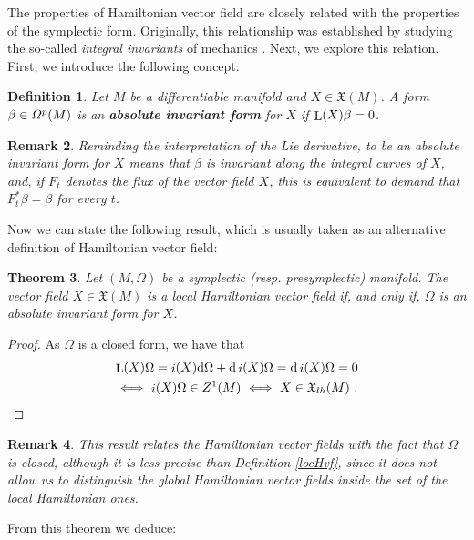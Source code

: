 \documentclass[12pt]{report}
\newtheorem{teor}{Theorem}[chapter]
\newtheorem{definition}[teor]{Definition}
\newtheorem{remark}[teor]{Remark}
\def\qed{\ifvmode\removelastskip\fi
{\unskip\nobreak\hfil\penalty50\hbox{}\nobreak\hfil
\hbox{\vrule height1.2ex width1.2ex}\parfillskip=0pt
\finalhyphendemerits=0 \par\smallskip}}
\def\vf{\mathfrak X}
\def\df{{\mit\Omega}}
\def\d{{\rm d}}
\def\Lie{\mathop{\rm L}\nolimits}
\def\inn{\mathop{i}\nolimits}
\begin{document}
The properties of Hamiltonian vector field are closely related with the properties
of the symplectic form. 
Originally, this relationship was established by studying the so-called {\sl integral invariants} of mechanics \cite{Ca-22,DG-80,Ga-70}.
Next, we explore this relation.
First, we introduce the following concept:

\begin{definition}
Let $M$ be a differentiable manifold and $X \in \vf (M)$.
A form $\beta \in \df^p(M)$ is an \textbf{absolute invariant form}
for $X$ if $\Lie (X)\beta = 0$.
\end{definition}

\begin{remark}{\rm  
Reminding the interpretation of the Lie derivative,
to be an absolute invariant form for $X$ means that
$\beta$ is invariant along the integral curves of $X$,
and, if $F_t$ denotes the flux of the vector field $X$,
this is equivalent to demand that $F_t^*\beta = \beta$ for every $t$.
}\end{remark}

Now we can state the following result, which is usually taken 
as an alternative definition of Hamiltonian vector field:

\begin{teor}
Let $(M,\Omega )$ be a symplectic (resp. presymplectic) manifold.
The vector field $X \in \vf (M)$ is a
local Hamiltonian vector field if, and only if,
$\Omega$ is an absolute invariant form for $X$.
\label{teoin}
\end{teor}
\begin{proof}
As $\Omega$ is a closed form, we have that
\begin{multline*}
\Lie (X)\Omega = \inn (X)\d \Omega + \d\inn (X)\Omega =
\d\inn (X)\Omega = 0 \\
\ \Longleftrightarrow \  \inn (X)\Omega \in Z^1(M)
\ \Longleftrightarrow \ X \in \vf_{lh}(M) \ .
\end{multline*}
  \qed  \end{proof}

\begin{remark}{\rm 
This result relates the Hamiltonian vector fields with the fact that $\Omega$
is closed, although it is less precise than Definition \ref{locHvf},
since it does not allow us to distinguish the global Hamiltonian vector fields inside the set of the local Hamiltonian ones.
}\end{remark}

From this theorem we deduce:
\end{document}

